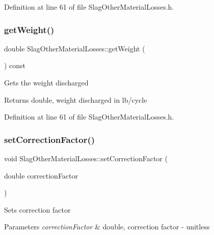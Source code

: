 Definition at line 61 of file Slag\+Other\+Material\+Losses.\+h.

\mbox{\label{class_slag_other_material_losses_a9b62b86eb4ec919d70dd8899ef5d3513}} 
\subsubsection{\texorpdfstring{get\+Weight()}{getWeight()}\hspace{0.1cm}{\footnotesize\ttfamily [3/3]}}
{\footnotesize\ttfamily double Slag\+Other\+Material\+Losses\+::get\+Weight (\begin{DoxyParamCaption}{ }\end{DoxyParamCaption}) const\hspace{0.3cm}{\ttfamily [inline]}}

Gets the weight discharged \begin{DoxyReturn}{Returns}
double, weight discharged in lb/cycle 
\end{DoxyReturn}


Definition at line 61 of file Slag\+Other\+Material\+Losses.\+h.

\mbox{\label{class_slag_other_material_losses_a2aa985511888327bed6039da79c8958a}} 
\subsubsection{\texorpdfstring{set\+Correction\+Factor()}{setCorrectionFactor()}\hspace{0.1cm}{\footnotesize\ttfamily [1/3]}}
{\footnotesize\ttfamily void Slag\+Other\+Material\+Losses\+::set\+Correction\+Factor (\begin{DoxyParamCaption}\item[{double}]{correction\+Factor }\end{DoxyParamCaption})\hspace{0.3cm}{\ttfamily [inline]}}

Sets correction factor 
\begin{DoxyParams}{Parameters}
{\em correction\+Factor} & double, correction factor -\/ unitless \\
\hline
\end{DoxyParams}


